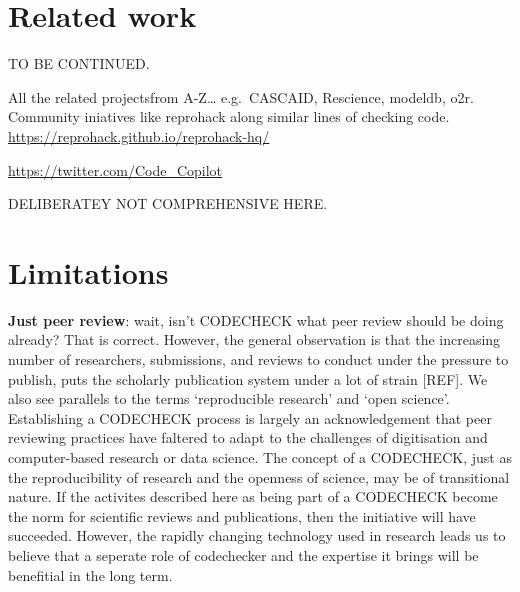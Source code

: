 \documentclass[12pt]{article}
\begin{document}
\section*{Related work}\label{related-work}

TO BE CONTINUED.

All the related projectsfrom A-Z\ldots{} e.g.~CASCAID, Rescience,
modeldb, o2r. Community iniatives like reprohack along similar lines of
checking code. \url{https://reprohack.github.io/reprohack-hq/}

\url{https://twitter.com/Code_Copilot}


DELIBERATEY NOT COMPREHENSIVE HERE.

\section*{Limitations}\label{limitations}

\textbf{Just peer review}: wait, isn't CODECHECK what peer review should be 
doing already? That is correct.
However, the general observation is that the increasing
number of researchers, submissions, and reviews to conduct under the
pressure to publish, puts the scholarly publication system under a lot
of strain [REF].  We also see parallels to the terms 
`reproducible research' and `open science'. Establishing a CODECHECK 
process is largely an acknowledgement that peer reviewing practices 
have faltered to adapt to the challenges of digitisation and computer-based
research or data science. The concept of a CODECHECK, just as the 
reproducibility of research and the openness of science, may be of 
transitional nature. If the activites described here as being part of a 
CODECHECK become the norm for scientific reviews and publications, then
the initiative will have succeeded.
However, the rapidly changing technology used in research leads us to 
believe that a seperate role of codechecker and the expertise it brings
will be benefitial in the long term.
\end{document}
